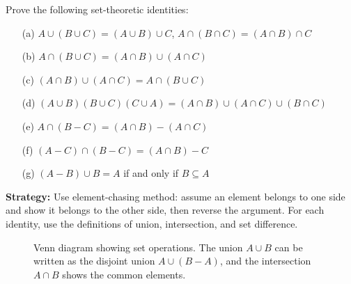 \begin{problembox}
Prove the following set-theoretic identities:
\begin{itemize}
\item[(a)] \( A \cup (B \cup C) = (A \cup B) \cup C \), \quad \( A \cap (B \cap C) = (A \cap B) \cap C \)
\item[(b)] \( A \cap (B \cup C) = (A \cap B) \cup (A \cap C) \)
\item[(c)] \( (A \cap B) \cup (A \cap C) = A \cap (B \cup C) \)
\item[(d)] \( (A \cup B)(B \cup C)(C \cup A) = (A \cap B) \cup (A \cap C) \cup (B \cap C) \)
\item[(e)] \( A \cap (B - C) = (A \cap B) - (A \cap C) \)
\item[(f)] \( (A - C) \cap (B - C) = (A \cap B) - C \)
\item[(g)] \( (A - B) \cup B = A \) if and only if \( B \subseteq A \)
\end{itemize}
\end{problembox}

\noindent\textbf{Strategy:} Use element-chasing method: assume an element belongs to one side and show it belongs to the other side, then reverse the argument. For each identity, use the definitions of union, intersection, and set difference.

\begin{figure}[h]
\centering
{}
\caption{Venn diagram showing set operations. The union $A \cup B$ can be written as the disjoint union $A \cup (B - A)$, and the intersection $A \cap B$ shows the common elements.}
\end{figure}

